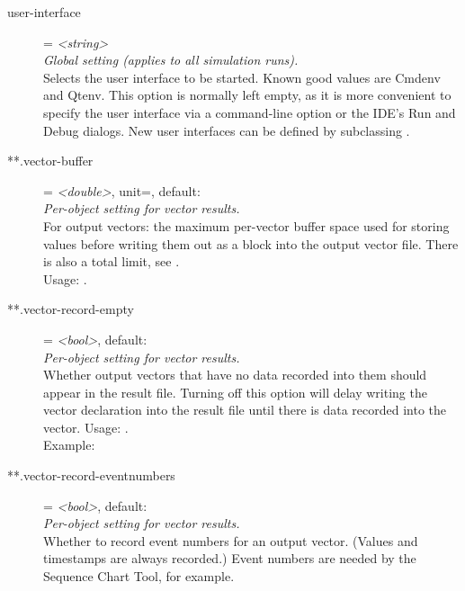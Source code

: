 \begin{description}
\item[user-interface] = \textit{<string>}\\
    \textit{Global setting (applies to all simulation runs).}\\
    Selects the user interface to be started. Known good values are Cmdenv and
    Qtenv. This option is normally left empty, as it is more convenient to
    specify the user interface via a command-line option or the IDE's Run and
    Debug dialogs. New user interfaces can be defined by subclassing
    .
\item[**.vector-buffer] = \textit{<double>}, unit=, default: \\
    \textit{Per-object setting for vector results.}\\
    For output vectors: the maximum per-vector buffer space used for storing
    values before writing them out as a block into the output vector file.
    There is also a total limit, see
    .\\
    Usage:
    .
\item[**.vector-record-empty] = \textit{<bool>}, default: \\
    \textit{Per-object setting for vector results.}\\
    Whether output vectors that have no data recorded into them should appear
    in the result file. Turning off this option will delay writing the vector
    declaration into the result file until there is data recorded into the
    vector. Usage:
    .\\
    Example:
\item[**.vector-record-eventnumbers] = \textit{<bool>}, default: \\
    \textit{Per-object setting for vector results.}\\
    Whether to record event numbers for an output vector. (Values and
    timestamps are always recorded.) Event numbers are needed by the Sequence
    Chart Tool, for example.\\

\end{description}
